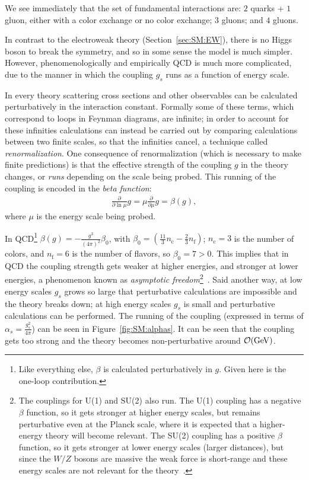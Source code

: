 We see immediately that the set of fundamental interactions are: $2$ quarks + $1$ gluon, either with a color exchange or no color exchange; $3$ gluons; and $4$ gluons.

In contrast to the electroweak theory (Section~\ref{sec:SM:EW}), there is no Higgs boson to break the symmetry, and so in some sense the model is much simpler.
However, phenomenologically and empirically QCD is much more complicated, due to the manner in which the coupling $g_s$ runs as a function of energy scale.

In every theory scattering cross sections and other observables can be calculated perturbatively in the interaction constant.
Formally some of these terms, which correspond to loops in Feynman diagrams, are infinite; in order to account for these infinities calculations can instead be carried out by comparing calculations between two finite scales, so that the infinities cancel, a technique called \textit{renormalization}.
One consequence of renormalization (which is necessary to make finite predictions) is that the effective strength of the coupling $g$ in the theory changes, or \textit{runs} depending on the scale being probed.
This running of the coupling is encoded in the \textit{beta function}:
\begin{align}
  \frac{\partial}{\partial \ln \mu}g = \mu\frac{\partial}{\partial\mu}g = \beta(g),
\end{align}
where $\mu$ is the energy scale being probed.

In QCD\footnote{Like everything else, $\beta$ is calculated perturbatively in $g$. Given here is the one-loop contribution.} $\beta(g) = -\frac{g^3}{(4\pi)^2}\beta_0$, with $\beta_0=(\frac{11}{3}n_\text{c} - \frac{2}{3} n_\text{f})$; $n_\text{c}=3$ is the number of colors, and $n_\text{f}=6$ is the number of flavors, so $\beta_0=7>0$.
This implies that in QCD the coupling strength gets weaker at higher energies, and stronger at lower energies, a phenomenon known as \textit{asymptotic freedom}\footnote{The couplings for U(1) and SU(2) also run. The U(1) coupling has a negative $\beta$ function, so it gets stronger at higher energy scales, but remains perturbative even at the Planck scale, where it is expected that a higher-energy theory will become relevant. The SU(2) coupling has a positive $\beta$ function, so it gets stronger at lower energy scales (larger distances), but since the $W/Z$ bosons are massive the weak force is short-range and these energy scales are not relevant for the theory~\cite{Kazakov:2000ra}.}~\cite{Gross:1973id,Politzer:1973fx,Gross:1974fm}.
Said another way, at low energy scales $g_s$ grows so large that perturbative calculations are impossible and the theory breaks down; at high energy scales $g_s$ is small and perturbative calculations can be performed.
The running of the coupling (expressed in terms of $\alpha_s = \frac{g_s^2}{4\pi}$) can be seen in Figure~\ref{fig:SM:alphas}.
It can be seen that the coupling gets too strong and the theory becomes non-perturbative around $\mathcal{O}(\mathrm{GeV})$.

